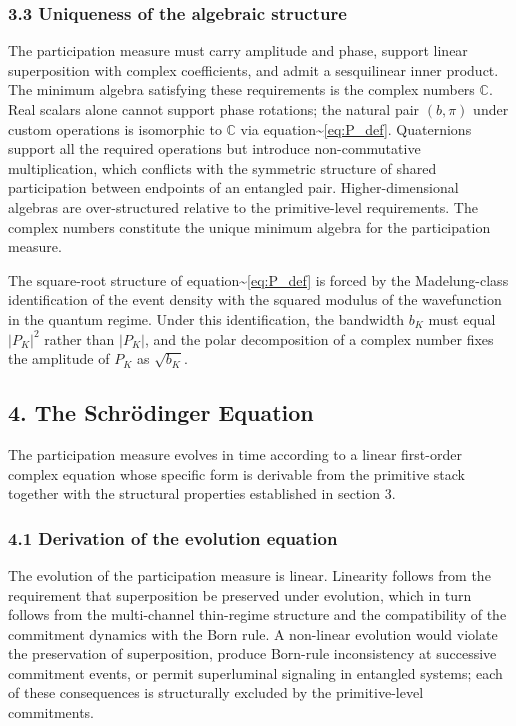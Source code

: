 \documentclass[
  11pt,
]{article}
\begin{document}
\subsubsection{3.3 Uniqueness of the algebraic
structure}\label{uniqueness-of-the-algebraic-structure}

The participation measure must carry amplitude and phase, support linear
superposition with complex coefficients, and admit a sesquilinear inner
product. The minimum algebra satisfying these requirements is the
complex numbers \(\mathbb{C}\). Real scalars alone cannot support phase
rotations; the natural pair \((b, \pi)\) under custom operations is
isomorphic to \(\mathbb{C}\) via
equation\textasciitilde{}\eqref{eq:P_def}. Quaternions support all the
required operations but introduce non-commutative multiplication, which
conflicts with the symmetric structure of shared participation between
endpoints of an entangled pair. Higher-dimensional algebras are
over-structured relative to the primitive-level requirements. The
complex numbers constitute the unique minimum algebra for the
participation measure.

The square-root structure of equation\textasciitilde{}\eqref{eq:P_def}
is forced by the Madelung-class identification of the event density with
the squared modulus of the wavefunction in the quantum regime. Under
this identification, the bandwidth \(b_K\) must equal \(|P_K|^2\) rather
than \(|P_K|\), and the polar decomposition of a complex number fixes
the amplitude of \(P_K\) as \(\sqrt{b_K}\).

\subsection{4. The Schrödinger
Equation}\label{the-schruxf6dinger-equation}

The participation measure evolves in time according to a linear
first-order complex equation whose specific form is derivable from the
primitive stack together with the structural properties established in
section 3.

\subsubsection{4.1 Derivation of the evolution
equation}\label{derivation-of-the-evolution-equation}

The evolution of the participation measure is linear. Linearity follows
from the requirement that superposition be preserved under evolution,
which in turn follows from the multi-channel thin-regime structure and
the compatibility of the commitment dynamics with the Born rule. A
non-linear evolution would violate the preservation of superposition,
produce Born-rule inconsistency at successive commitment events, or
permit superluminal signaling in entangled systems; each of these
consequences is structurally excluded by the primitive-level
commitments.
\end{document}
